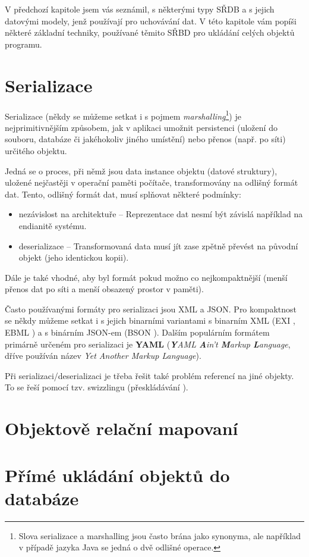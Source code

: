 V předchozí kapitole jsem vás seznámil, s některými typy SŘDB a s jejich datovými modely, jenž používají pro uchovávání dat. V této kapitole vám popíši některé základní techniky, používané těmito SŘBD pro ukládání celých objektů programu.

\section{Serializace}
Serializace (někdy se můžeme setkat i s pojmem \emph{marshalling}\footnote{Slova serializace a marshalling jsou často brána jako synonyma, ale například v případě jazyka Java se jedná o dvě odlišné operace.\cite{rfc:2713}}) je nejprimitivnějším způsobem, jak v aplikaci umožnit persistenci (uložení do souboru, databáze či jakéhokoliv jiného umístění) nebo přenos (např. po síti) určitého objektu.

Jedná se o proces, při němž jsou data instance objektu (datové struktury), uložené nejčastěji v operační paměti počítače, transformovány na odlišný formát dat. Tento, odlišný formát dat, musí splňovat některé podmínky:

\begin{itemize}
\item nezávislost na architektuře -- Reprezentace dat nesmí být závislá například na endianitě systému.
\item deserializace -- Transformovaná data musí jít zase zpětně převést na původní objekt (jeho identickou kopii).
\end{itemize}

Dále je také vhodné, aby byl formát pokud možno co nejkompaktnější (menší přenos dat po síti a menší obsazený prostor v paměti).

Často používanými formáty pro serializaci jsou XML a JSON. Pro kompaktnost se někdy můžeme setkat i s jejich binarními variantami s binarním XML (EXI \cite{w3c:exi}, EBML \cite{rfc:ebml}) a s binárním JSON-em (BSON \cite{bson:spec}). Dalším populárním formátem primárně určeném pro serializaci je \textbf{YAML} \cite{rfc:yaml} (\emph{\textbf{Y}AML \textbf{A}in’t \textbf{M}arkup \textbf{L}anguage}, dříve používán název \emph{Yet Another Markup Language}).

Při serializaci/deserializaci je třeba řešit také problém referencí na jiné objekty. To se řeší pomocí tzv. swizzlingu (přeskládávání \cite{wiki:swizz}).

\section{Objektově relační mapovaní}

\section{Přímé ukládání objektů do databáze}
